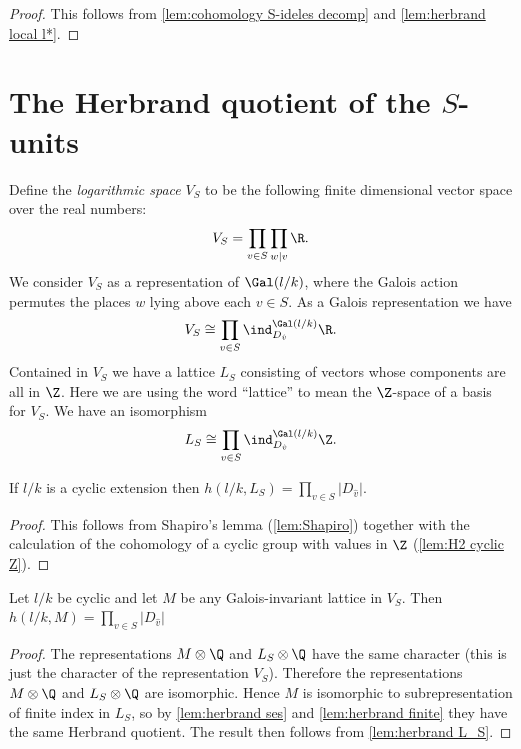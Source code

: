 \begin{proof}
	This follows from \ref{lem:cohomology S-ideles decomp} and
	\ref{lem:herbrand local l*}.
\end{proof}





\section{The Herbrand quotient of the \texorpdfstring{$S$}{S}-units}

Define the \emph{logarithmic space} $V_S$ to be the following finite dimensional vector space
over the real numbers:
\[
	V_S = \prod_{v \in S} \prod_{w | v} \R.
\]
We consider $V_S$ as a representation of $\Gal(l/k)$, where the Galois action
permutes the places $w$ lying above each $v \in S$.
As a Galois representation we have
\[
	V_S \cong \prod_{v \in S} \ind_{D_{\hat v}}^{\Gal(l/k)} \R.
\]
Contained in $V_S$ we have a lattice $L_S$ consisting of vectors whose components are all in $\Z$.
Here we are using the word ``lattice'' to mean the $\Z$-space of a basis for $V_S$.
We have an isomorphism
\[
	L_S \cong \prod_{v \in S} \ind_{D_{\hat v}}^{\Gal(l/k)} \Z.
\]

\begin{lemma} \label{lem:herbrand L_S}
	If $l/k$ is a cyclic extension then
	$h(l/k,L_S) = \prod_{v \in S} |D_{\hat v}|$.
\end{lemma}

\begin{proof}
	This follows from Shapiro's lemma (\ref{lem:Shapiro})
	together with the calculation
	of the cohomology of a cyclic group with values in $\Z$ (\ref{lem:H2 cyclic Z}).
\end{proof}

\begin{lemma} \label{lem:herbrand log lattice}
	Let $l/k$ be cyclic and let $M$ be any Galois-invariant lattice in $V_S$.
	Then $h(l/k,M) = \prod_{v \in S} |D_{\hat v}|$
\end{lemma}

\begin{proof}
	The representations $M \otimes \Q$ and $L_S \otimes \Q$ have the same character
	(this is just the character of the representation $V_S$).
	Therefore the representations $M \otimes \Q$ and $L_S \otimes \Q$ are isomorphic.
	Hence $M$ is isomorphic to subrepresentation of finite index in $L_S$,
	so by \ref{lem:herbrand ses} and \ref{lem:herbrand finite}
	they have the same Herbrand quotient.
	The result then follows from \ref{lem:herbrand L_S}.
\end{proof}


